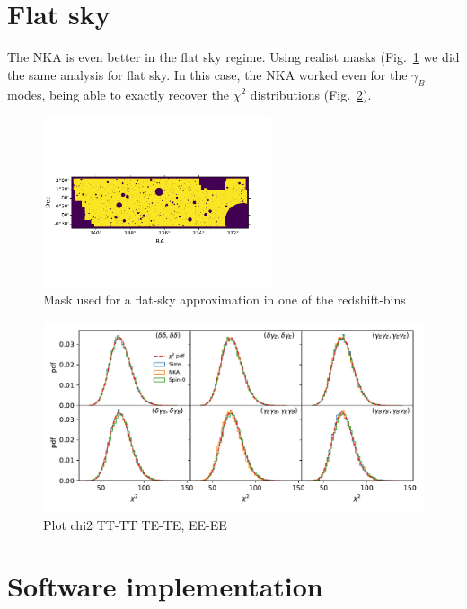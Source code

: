 \documentclass[a4paper,11pt]{article}
\begin{document}
  \section{Flat sky}\label{app:flat}
    The NKA is even better in the flat sky regime. Using realist masks (Fig.~\ref{fig:mask_flat} we did the same analysis for flat sky. In this case, the NKA worked even for the $\gamma_B$ modes, being able to exactly recover the $\chi^2$ distributions (Fig.~\ref{fig:chi2_1bin_flat}).
    \begin{figure}[htb]
      \centering
      \includegraphics[width=0.6\textwidth]{./figures/mask-lss_flat1.pdf}
      \caption{Mask used for a flat-sky approximation in one of the redshift-bins} \label{fig:mask_flat}
    \end{figure}

    \begin{figure}[htb]
      \centering
      \includegraphics[width=\textwidth]{./figures/run_chi2_TT_TE_EE_TB_EB_BB.pdf}
      \caption{Plot chi2 TT-TT TE-TE, EE-EE}
      \label{fig:chi2_1bin_flat}
    \end{figure}

  \section{Software implementation}\label{app:namaster}
    \lipsum[4]
\end{document}
